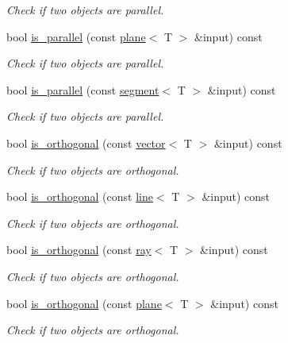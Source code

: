 \begin{DoxyCompactItemize}
\begin{DoxyCompactList}\small\item\em Check if two objects are parallel. \end{DoxyCompactList}\item 
bool \hyperlink{classddd_1_1segment_a00bb060cf8faa57badf57893e1cdfad2}{is\+\_\+parallel} (const \hyperlink{classddd_1_1plane}{plane}$<$ T $>$ \&input) const
\begin{DoxyCompactList}\small\item\em Check if two objects are parallel. \end{DoxyCompactList}\item 
bool \hyperlink{classddd_1_1segment_a0fab67ddfefa1cc41bf8677387bd5492}{is\+\_\+parallel} (const \hyperlink{classddd_1_1segment}{segment}$<$ T $>$ \&input) const
\begin{DoxyCompactList}\small\item\em Check if two objects are parallel. \end{DoxyCompactList}\item 
bool \hyperlink{classddd_1_1segment_ab07434a63e42e1afd1a1ef2927cd1b7d}{is\+\_\+orthogonal} (const \hyperlink{classddd_1_1vector}{vector}$<$ T $>$ \&input) const
\begin{DoxyCompactList}\small\item\em Check if two objects are orthogonal. \end{DoxyCompactList}\item 
bool \hyperlink{classddd_1_1segment_ae4c59be47f1e0946b45e4d0ebe0390c9}{is\+\_\+orthogonal} (const \hyperlink{classddd_1_1line}{line}$<$ T $>$ \&input) const
\begin{DoxyCompactList}\small\item\em Check if two objects are orthogonal. \end{DoxyCompactList}\item 
bool \hyperlink{classddd_1_1segment_a9f639ed78d1b53584ad8966f738497d5}{is\+\_\+orthogonal} (const \hyperlink{classddd_1_1ray}{ray}$<$ T $>$ \&input) const
\begin{DoxyCompactList}\small\item\em Check if two objects are orthogonal. \end{DoxyCompactList}\item 
bool \hyperlink{classddd_1_1segment_af4d15c7cefba6477b86f3103b3d6d340}{is\+\_\+orthogonal} (const \hyperlink{classddd_1_1plane}{plane}$<$ T $>$ \&input) const
\begin{DoxyCompactList}\small\item\em Check if two objects are orthogonal. \end{DoxyCompactList}\item 

\end{DoxyCompactItemize}
